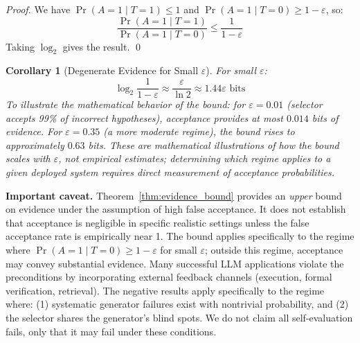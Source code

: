 \documentclass[11pt]{article}
\newtheorem{corollary}[theorem]{Corollary}
\begin{document}
\begin{proof}
We have $\Pr(A = 1 \mid T = 1) \leq 1$ and $\Pr(A = 1 \mid T = 0) \geq 1 - \varepsilon$,
so:
\begin{equation}
\frac{\Pr(A = 1 \mid T = 1)}{\Pr(A = 1 \mid T = 0)} \leq \frac{1}{1 - \varepsilon}
\end{equation}
Taking $\log_2$ gives the result. \qed
\end{proof}

\begin{corollary}[Degenerate Evidence for Small $\varepsilon$]
For small $\varepsilon$:
\begin{equation}
\log_2 \frac{1}{1 - \varepsilon} \approx \frac{\varepsilon}{\ln 2} \approx 1.44\varepsilon
\text{ bits}
\end{equation}
To illustrate the mathematical behavior of the bound: for $\varepsilon = 0.01$ (selector
accepts 99\% of incorrect hypotheses), acceptance provides at most $0.014$ bits of evidence.
For $\varepsilon = 0.35$ (a more moderate regime), the bound rises to approximately $0.63$
bits. These are mathematical illustrations of how the bound scales with $\varepsilon$, not
empirical estimates; determining which regime applies to a given deployed system requires
direct measurement of acceptance probabilities.
\end{corollary}

\textbf{Important caveat.} Theorem~\ref{thm:evidence_bound} provides an \emph{upper} bound
on evidence under the assumption of high false acceptance. It does not establish that
acceptance is negligible in specific realistic settings unless the false acceptance rate is
empirically near 1. The bound applies specifically to the regime where $\Pr(A=1 \mid T=0)
\geq 1-\varepsilon$ for small $\varepsilon$; outside this regime, acceptance may convey
substantial evidence. Many successful LLM applications violate the preconditions by
incorporating external feedback channels (execution, formal verification, retrieval). The
negative results apply specifically to the regime where: (1) systematic generator failures
exist with nontrivial probability, and (2) the selector shares the generator's blind spots.
We do not claim all self-evaluation fails, only that it may fail under these conditions.
\end{document}
